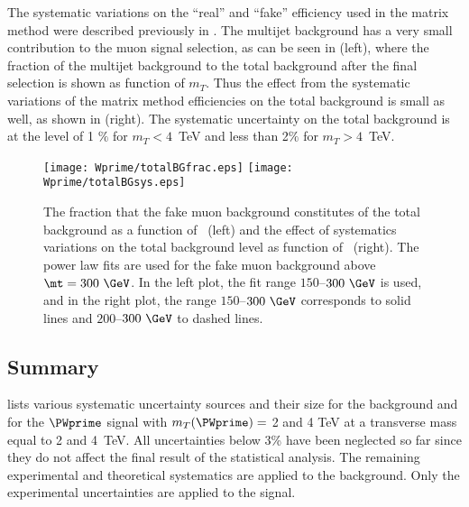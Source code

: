 The systematic variations on the ``real'' and ``fake'' efficiency used in the matrix method were
described previously in .
The multijet background has a very small contribution to the muon signal selection, as can be seen in 
 (left), where the fraction of the multijet background to the total background
after the final selection is shown as function of $m_T$. Thus the effect from the systematic
variations of the matrix method efficiencies on the total background is small as well, as shown in
 (right). 
The systematic uncertainty on the total background is at the level of 1 $\%$ for $m_T<4$~TeV and less than 2$\%$ for $m_T>4$~TeV.

\begin{figure}[!htb]
  \centering
  \texttt{[image: Wprime/totalBGfrac.eps]}
  \texttt{[image: Wprime/totalBGsys.eps]}
  \caption{The fraction that the fake muon background constitutes of the total background
as a function of \mt\ (left) and the effect of systematics variations on the total background
level as function of \mt\ (right). The power law fits are used for the fake muon background above
$\mt=300~\GeV$. In the left plot, the fit range $150$--$300~\GeV$ is used, and in the right plot, the
range $150$--$300~\GeV$ corresponds to solid lines and $200$--$300~\GeV$ to dashed lines.}
  \label{fig:muMMfinal}
\end{figure}

\subsection{Summary}
 lists various systematic uncertainty sources
and their size for the background and for the $\PWprime$ signal with $m_T(\PWprime)=$ 2 and 4 TeV at a transverse mass equal to 2 and 4~TeV.
All uncertainties below $3$\% have been neglected so far
since they do not affect the final result of the statistical analysis. 
The remaining experimental and theoretical systematics are applied to the background.
Only the experimental uncertainties are applied to the signal. 

